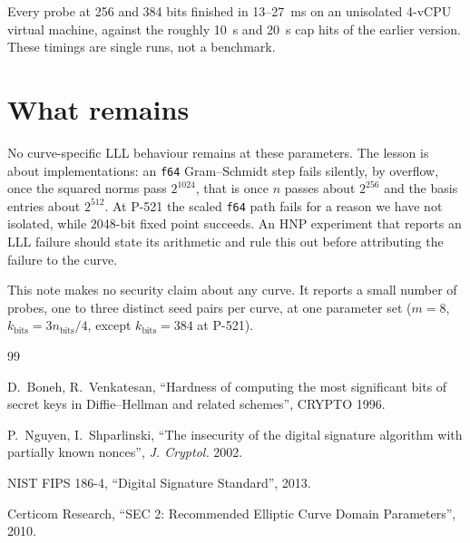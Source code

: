 \documentclass[10pt,a4paper]{article}
\begin{document}
Every probe at 256 and 384 bits finished in 13--27~ms on an
unisolated 4-vCPU virtual machine, against the roughly 10~s and 20~s
cap hits of the earlier version. These timings are single runs, not a
benchmark.

\section{What remains}

No curve-specific LLL behaviour remains at these parameters. The
lesson is about implementations: an \texttt{f64} Gram--Schmidt step
fails silently, by overflow, once the squared norms pass $2^{1024}$,
that is once $n$ passes about $2^{256}$ and the basis entries about
$2^{512}$. At P-521 the scaled \texttt{f64} path fails for a
reason we have not isolated, while 2048-bit fixed point succeeds. An HNP
experiment that reports an LLL failure should state its arithmetic
and rule this out before attributing the failure to the curve.

This note makes no security claim about any curve. It reports a small
number of probes, one to three distinct seed pairs per curve, at one
parameter set ($m = 8$, $k_{\text{bits}} = 3 n_{\text{bits}}/4$, except
$k_{\text{bits}} = 384$ at P-521).

\begin{thebibliography}{99}

 D.~Boneh, R.~Venkatesan, ``Hardness of computing
the most significant bits of secret keys in Diffie--Hellman and
related schemes'', CRYPTO 1996.

 P.~Nguyen, I.~Shparlinski, ``The insecurity of
the digital signature algorithm with partially known nonces'',
\emph{J. Cryptol.} 2002.

 NIST FIPS 186-4, ``Digital Signature Standard'',
2013.

 Certicom Research, ``SEC 2: Recommended Elliptic Curve
Domain Parameters'', 2010.

\end{thebibliography}
\end{document}
